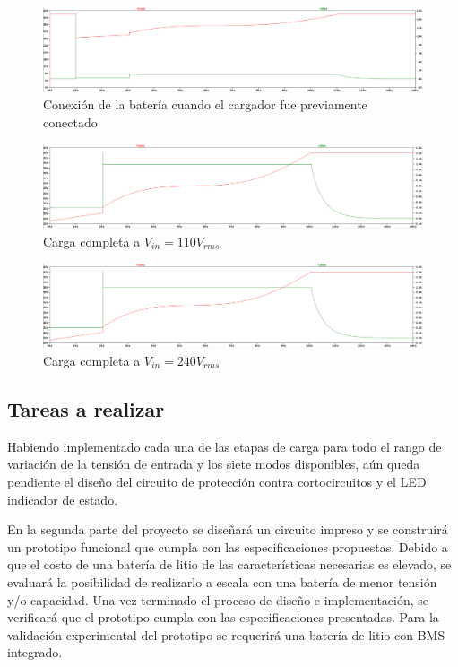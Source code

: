 \begin{figure}
    \centering
    \includegraphics[width=\textwidth]{images/conexion.png}
    \caption{Conexión de la batería cuando el cargador fue previamente conectado}
    \label{fig:conexion}
\end{figure}

\begin{figure}
    \centering
    \includegraphics[width=\textwidth]{images/110V_1A.png}
    \caption{Carga completa a $V_{in}=110V_{rms}$}
    \label{fig:110V_1A}
\end{figure}

\begin{figure}
    \centering
    \includegraphics[width=\textwidth]{images/240V_1A.png}
    \caption{Carga completa a $V_{in}=240V_{rms}$}
    \label{fig:240V_1A}
\end{figure}

\subsection{Tareas a realizar}
Habiendo implementado cada una de las etapas de carga para todo el rango de variación de la tensión de entrada y los siete modos disponibles, 
aún queda pendiente el diseño del circuito de protección contra cortocircuitos y el LED indicador de estado.  

En la segunda parte del proyecto se diseñará un circuito impreso y se construirá un prototipo funcional que cumpla con las especificaciones propuestas. 
Debido a que el costo de una batería de litio de las características necesarias es elevado,
se evaluará la posibilidad de realizarlo a escala con una batería de menor tensión y/o capacidad.
Una vez terminado el proceso de diseño e implementación, se verificará que el prototipo cumpla con las especificaciones presentadas.
Para la validación experimental del prototipo se requerirá una batería de litio con BMS integrado. 